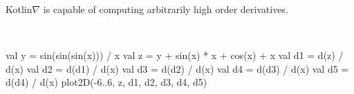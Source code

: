 \documentclass[portrait,a0b,final,a4resizeable]{a0poster}
\def\jointspacing{\vspace{0.3in}}
\begin{document}
\begin{poster}
\begin{multicols}{2}
      \jointspacing

      \null\hspace*{3cm}\begin{minipage}[c]{0.85\columnwidth}
                            Kotlin$\nabla$ is capable of computing arbitrarily high order derivatives.
      \end{minipage}\\
\null\hspace*{2cm}\begin{minipage}[c]{0.48\columnwidth}
\begin{kotlinlisting}
val y = sin(sin(sin(x))) / x
val z = y + sin(x) * x + cos(x) + x
val d1 = d(z) / d(x)
val d2 = d(d1) / d(x)
val d3 = d(d2) / d(x)
val d4 = d(d3) / d(x)
val d5 = d(d4) / d(x)
plot2D(-6..6, z, d1, d2, d3, d4, d5)
\end{kotlinlisting}
\end{minipage}
\null\hspace*{2cm}\begin{minipage}[c]{0.40\columnwidth}
                          \vspace*{1.5cm}

                    \center{}
\end{minipage}


\end{multicols}
\end{poster}
\end{document}
